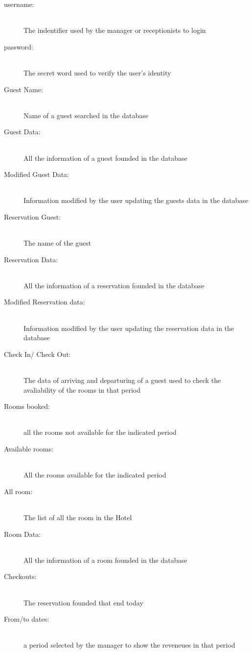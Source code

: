 \begin{description}
    
  \item[username:] \hfill \\ The indentifier used by the manager or receptionists to login 
    
  \item[password:] \hfill \\ The secret word used to verify the user's identity
    
  \item[Guest Name:] \hfill \\ Name of a guest searched in the database
    
  \item[Guest Data:] \hfill \\ All the information of a guest founded in the database
    
  \item[Modified Guest Data:] \hfill \\ Information modified by the user updating the guests data in the database

  \item[Reservation Guest:] \hfill \\ The name of the guest 
    
  \item[Reservation Data:] \hfill \\ All the information of a reservation founded in the database
    
  \item[Modified Reservation data:] \hfill \\ Information modified by the user updating the reservation data in the database

  \item[Check In/ Check Out:] \hfill \\ The data of arriving and departuring of a guest used to check the avaliability of the rooms in that period
    
  \item[Rooms booked:] \hfill \\ all the rooms not available for the indicated period
    
  \item[Available rooms:] \hfill \\ All the rooms available for the indicated period
    
  \item[All room:] \hfill \\ The list of all the room in the Hotel
    
  \item[Room Data:] \hfill \\ All the information of a room founded in the database
    
  \item[Checkouts:] \hfill \\ The reservation founded that end today
    
  \item[From/to dates:] \hfill \\ a period selected by the manager to show the reveneues in that period
    
\end {description}
